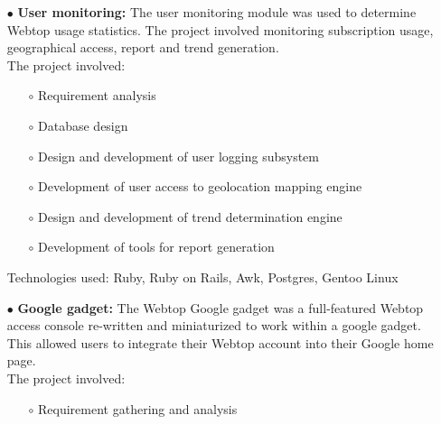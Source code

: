 \documentclass{scrartcl}
\begin{document}
\begin{cv}{
\href{http://www.develmj.com}{}
}
{\begin{itemize}
    themselves using an integrated chat client (browser-based).\\
    The project involved:
    {\scriptsize
    \begin{itemize}
    \item[\footnotesize$\circ$] Design and development of the browser based chat system
    \item[\footnotesize$\circ$] Integration of JWChat with the existing Ruby on Rails based framework
    \item[\footnotesize$\circ$] Configuration and integration of ejbbaerd with the Rails backend
    \item[\footnotesize$\circ$] Design and development of user chat
      access rights engine
    \end{itemize}}
    Technologies used: Ruby, Ruby on Rails, ejabberd, JWChat, XML
  \item[\footnotesize$\bullet$] \textbf{User monitoring: }The user monitoring module was used to determine
    Webtop usage statistics. The project involved monitoring subscription usage,
    geographical access, report and trend generation.\\
    The project involved:
    {\scriptsize
    \begin{itemize}
    \item[\footnotesize$\circ$] Requirement analysis
    \item[\footnotesize$\circ$] Database design
    \item[\footnotesize$\circ$] Design and development of user logging subsystem
    \item[\footnotesize$\circ$] Development of user access to geolocation mapping engine
    \item[\footnotesize$\circ$] Design and development of trend determination engine
    \item[\footnotesize$\circ$] Development of tools for report
      generation
    \end{itemize}}
    Technologies used: Ruby, Ruby on Rails, Awk, Postgres, Gentoo Linux
  \item[\footnotesize$\bullet$] \textbf{Google gadget: }The Webtop Google gadget was a full-featured Webtop
    access console re-written and miniaturized to work within a google gadget.
    This allowed users to integrate their Webtop account into their Google home
    page.\\
    The project involved:
    {\scriptsize
    \begin{itemize}
    \item[\footnotesize$\circ$] Requirement gathering and analysis

\end{itemize}}
\end{itemize}}
\end{cv}
\end{document}
